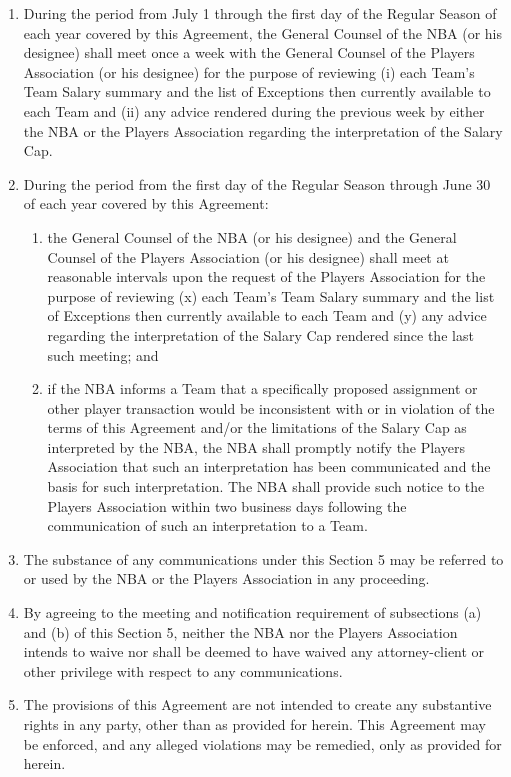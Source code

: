 \documentclass[
]{book}
\providecommand{\tightlist}{%
  \setlength{\itemsep}{0pt}\setlength{\parskip}{0pt}}
\begin{document}
\begin{enumerate}
\def\labelenumi{(\alph{enumi})}
\tightlist
\item
  During the period from July 1 through the first day of the Regular Season of each year covered by this Agreement, the General Counsel of the NBA (or his designee) shall meet once a week with the General Counsel of the Players Association (or his designee) for the purpose of reviewing (i) each Team's Team Salary summary and the list of Exceptions then currently available to each Team and (ii) any advice rendered during the previous week by either the NBA or the Players Association regarding the interpretation of the Salary Cap.
\item
  During the period from the first day of the Regular Season through June 30 of each year covered by this Agreement:

  \begin{enumerate}
  \def\labelenumii{(\roman{enumii})}
  \tightlist
  \item
    the General Counsel of the NBA (or his designee) and the General Counsel of the Players Association (or his designee) shall meet at reasonable intervals upon the request of the Players Association for the purpose of reviewing (x) each Team's Team Salary summary and the list of Exceptions then currently available to each Team and (y) any advice regarding the interpretation of the Salary Cap rendered since the last such meeting; and
  \item
    if the NBA informs a Team that a specifically proposed assignment or other player transaction would be inconsistent with or in violation of the terms of this Agreement and/or the limitations of the Salary Cap as interpreted by the NBA, the NBA shall promptly notify the Players Association that such an interpretation has been communicated and the basis for such interpretation. The NBA shall provide such notice to the Players Association within two business days following the communication of such an interpretation to a Team.
  \end{enumerate}
\item
  The substance of any communications under this Section 5 may be referred to or used by the NBA or the Players Association in any proceeding.
\item
  By agreeing to the meeting and notification requirement of subsections (a) and (b) of this Section 5, neither the NBA nor the Players Association intends to waive nor shall be deemed to have waived any attorney-client or other privilege with respect to any communications.
\item
  The provisions of this Agreement are not intended to create any substantive rights in any party, other than as provided for herein. This Agreement may be enforced, and any alleged violations may be remedied, only as provided for herein.
\end{enumerate}
\end{document}
